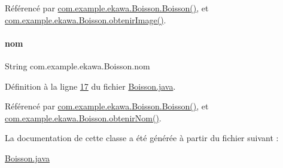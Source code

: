 Référencé par \hyperlink{_boisson_8java_source_l00025}{com.\+example.\+ekawa.\+Boisson.\+Boisson()}, et \hyperlink{_boisson_8java_source_l00044}{com.\+example.\+ekawa.\+Boisson.\+obtenir\+Image()}.

\mbox{\label{classcom_1_1example_1_1ekawa_1_1_boisson_a9c932ca6665790c36acb6d4792a5a31a}} 
\paragraph{\texorpdfstring{nom}{nom}}
{\footnotesize\ttfamily String com.\+example.\+ekawa.\+Boisson.\+nom\hspace{0.3cm}{\ttfamily [private]}}



Définition à la ligne \hyperlink{_boisson_8java_source_l00017}{17} du fichier \hyperlink{_boisson_8java_source}{Boisson.\+java}.



Référencé par \hyperlink{_boisson_8java_source_l00025}{com.\+example.\+ekawa.\+Boisson.\+Boisson()}, et \hyperlink{_boisson_8java_source_l00035}{com.\+example.\+ekawa.\+Boisson.\+obtenir\+Nom()}.



La documentation de cette classe a été générée à partir du fichier suivant \+:\begin{DoxyCompactItemize}
\item 
\hyperlink{_boisson_8java}{Boisson.\+java}\end{DoxyCompactItemize}
